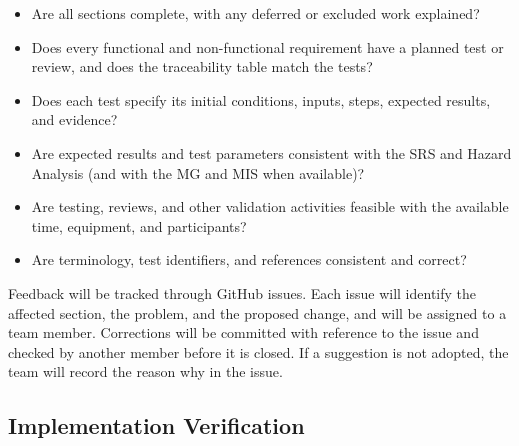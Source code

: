 \documentclass[10pt,titlepage]{article}
\begin{document}
\begin{itemize}[label={$\square$}, leftmargin=*, itemsep=0.35em]
    \item Are all sections complete, with any deferred or
    excluded work explained?

    \item Does every functional and non-functional requirement have a planned
    test or review, and does the traceability table match the tests?

    \item Does each test specify its initial conditions, inputs, steps, expected results, and evidence?

    \item Are expected results and test parameters consistent with the SRS
    and Hazard Analysis (and with the MG and MIS when available)?

    \item Are testing, reviews, and other validation activities feasible with the available time, equipment, and participants?

    \item Are terminology, test identifiers, and references consistent and
    correct?
\end{itemize}

Feedback will be tracked through GitHub issues. Each issue will identify the affected section, the problem,
and the proposed change, and will be assigned to a team member. Corrections
will be committed with reference to the issue and checked by another member
before it is closed. If a suggestion is not adopted, the team will record the
reason why in the issue.

\subsection{Implementation Verification}



\end{document}
